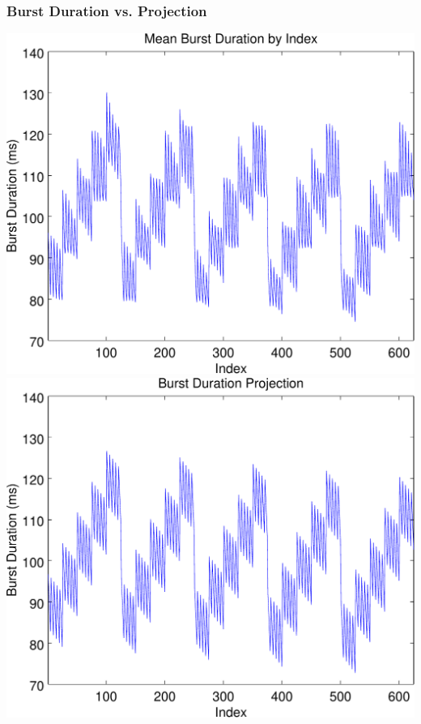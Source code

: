 \documentclass{beamer}
\theoremstyle{plain}
\theoremstyle{definition}
\begin{document}
\begin{frame}\frametitle{Burst Duration vs. Projection}
  \begin{center}
    \includegraphics[scale=.32]{BurstDuration.pdf}%
    \includegraphics[scale=.32]{BurstDurationProjection.pdf}
  \end{center}
\end{frame}
\end{document}
